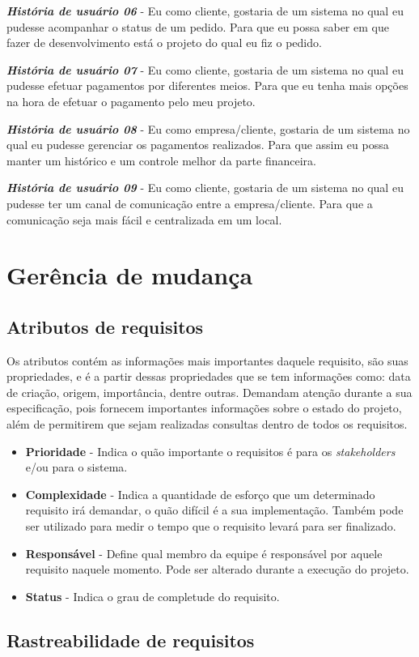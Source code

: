 \textbf{\textit{História de usuário 06}} - Eu como cliente, gostaria de um sistema no qual eu pudesse acompanhar o status de um pedido. Para que eu possa saber em que fazer de desenvolvimento está o projeto do qual eu fiz o pedido.

\textbf{\textit{História de usuário 07}} - Eu como cliente, gostaria de um sistema no qual eu pudesse efetuar pagamentos por diferentes meios. Para que eu tenha mais opções na hora de efetuar o pagamento pelo meu projeto.

\textbf{\textit{História de usuário 08}} - Eu como empresa/cliente, gostaria de um sistema no qual eu pudesse gerenciar os pagamentos realizados. Para que assim eu possa manter um histórico e um controle melhor da parte financeira.

\textbf{\textit{História de usuário 09}} - Eu como cliente, gostaria de um sistema no qual eu pudesse ter um canal de comunicação entre a empresa/cliente. Para que a comunicação seja mais fácil e centralizada em um local.

\section{Gerência de mudança}
\subsection{Atributos de requisitos}
Os atributos contém as informações mais importantes daquele requisito, são suas propriedades, e é a partir dessas propriedades que se tem informações como: data de criação, origem, importância, dentre outras. Demandam atenção durante a sua especificação, pois fornecem importantes informações sobre o estado do projeto, além de permitirem que sejam realizadas consultas dentro de todos os requisitos.
\begin{itemize}
\item \textbf{Prioridade} - Indica o quão importante o requisitos é para os \textit{stakeholders} e/ou para o sistema.
\item \textbf{Complexidade} - Indica a quantidade de esforço que um determinado requisito irá demandar, o quão difícil é a sua implementação. Também pode ser utilizado para medir o tempo que o requisito levará para ser finalizado.
\item \textbf{Responsável} - Define qual membro da equipe é responsável por aquele requisito naquele momento. Pode ser alterado durante a execução do projeto.
\item \textbf{Status} - Indica o grau de completude do requisito.
\end{itemize}
\subsection{Rastreabilidade de requisitos}